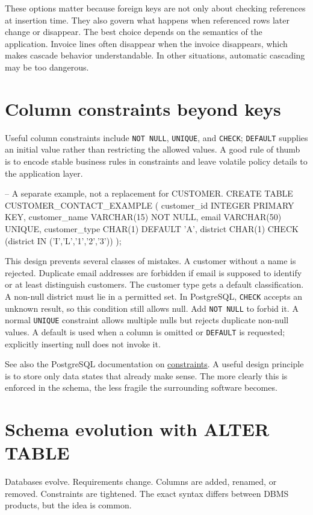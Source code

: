 \documentclass[11pt,a4paper,openany]{book}
\begin{document}
These options matter because foreign keys are not only about checking references at insertion time. They also govern what happens when referenced rows later change or disappear. The best choice depends on the semantics of the application. Invoice lines often disappear when the invoice disappears, which makes cascade behavior understandable. In other situations, automatic cascading may be too dangerous.

\section{Column constraints beyond keys}
Useful column constraints include \texttt{NOT NULL}, \texttt{UNIQUE}, and \texttt{CHECK}; \texttt{DEFAULT} supplies an initial value rather than restricting the allowed values. A good rule of thumb is to encode stable business rules in constraints and leave volatile policy details to the application layer.

\begin{codesql}
-- A separate example, not a replacement for CUSTOMER.
CREATE TABLE CUSTOMER_CONTACT_EXAMPLE (
  customer_id   INTEGER      PRIMARY KEY,
  customer_name VARCHAR(15)  NOT NULL,
  email         VARCHAR(50)  UNIQUE,
  customer_type CHAR(1)      DEFAULT 'A',
  district      CHAR(1)      CHECK (district IN ('I','L','1','2','3'))
);
\end{codesql}

This design prevents several classes of mistakes. A customer without a name is rejected. Duplicate email addresses are forbidden if email is supposed to identify or at least distinguish customers. The customer type gets a default classification. A non-null district must lie in a permitted set. In PostgreSQL, \texttt{CHECK} accepts an unknown result, so this condition still allows null. Add \texttt{NOT NULL} to forbid it. A normal \texttt{UNIQUE} constraint allows multiple nulls but rejects duplicate non-null values. A default is used when a column is omitted or \texttt{DEFAULT} is requested; explicitly inserting null does not invoke it.

See also the PostgreSQL documentation on \href{https://www.postgresql.org/docs/18/ddl-constraints.html}{constraints}. A useful design principle is to store only data states that already make sense. The more clearly this is enforced in the schema, the less fragile the surrounding software becomes.

\section{Schema evolution with ALTER TABLE}
Databases evolve. Requirements change. Columns are added, renamed, or removed. Constraints are tightened. The exact syntax differs between DBMS products, but the idea is common.
\end{document}
